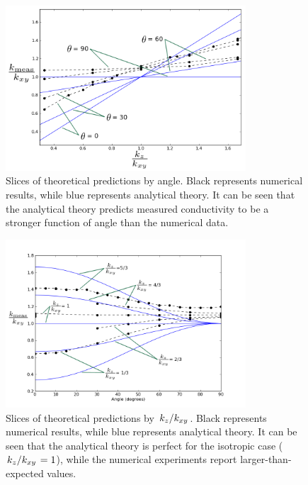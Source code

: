 \begin{figure}[h]
\centering
\includegraphics[width=0.8\textwidth]{fig/byAngle.png}
\caption{Slices of theoretical predictions by angle. Black represents numerical results, while blue represents analytical theory. It can be seen that the analytical theory predicts measured conductivity to be a stronger function of angle than the numerical data.}
\label{fig:by_angle}
\end{figure}


\begin{figure}[h]
\centering
\includegraphics[width=0.8\textwidth]{fig/byKratio.png}
\caption{Slices of theoretical predictions by \(\left.{k_z}\middle/{k_{xy}}\right.\). Black represents numerical results, while blue represents analytical theory. It can be seen that the analytical theory
is perfect for the isotropic case (\(\left.{k_z}\middle/{k_{xy}}\right. = 1\)), while the numerical experiments report larger-than-expected values.}
\label{fig:by_kratio}
\end{figure}

